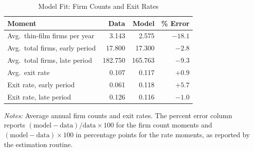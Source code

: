 \documentclass[12pt]{article}
\begin{document}
\begin{table}[htbp]
\centering
\small
\caption{Model Fit: Firm Counts and Exit Rates}
\label{tab:moment_fit_firms_rates}
\begin{tabular}{lrrr}
\toprule
Moment & Data & Model & \% Error \\
\midrule
Avg.\ thin-film firms per year & 3.143 & 2.575 & $-18.1$ \\
Avg.\ total firms, early period & 17.800 & 17.300 & $-2.8$ \\
Avg.\ total firms, late period & 182.750 & 165.763 & $-9.3$ \\
\addlinespace
Avg.\ exit rate & 0.107 & 0.117 & $+0.9$ \\
Exit rate, early period & 0.061 & 0.118 & $+5.7$ \\
Exit rate, late period & 0.126 & 0.116 & $-1.0$ \\
\bottomrule
\end{tabular}
\begin{minipage}{0.85\textwidth}
\footnotesize
\vspace{0.5em}
\textit{Notes:} Average annual firm counts and exit rates. The percent error column reports $(\text{model} - \text{data})/\text{data} \times 100$ for the firm count moments and $(\text{model} - \text{data}) \times 100$ in percentage points for the rate moments, as reported by the estimation routine.
\end{minipage}
\end{table}
 
\end{document}
